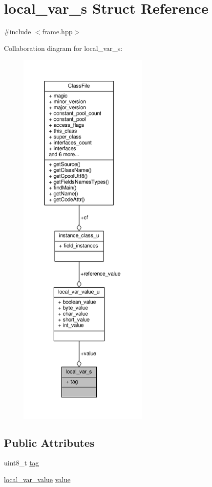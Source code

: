 \hypertarget{structlocal__var__s}{\section{local\+\_\+var\+\_\+s Struct Reference}
\label{structlocal__var__s}
}


{\ttfamily \#include $<$frame.\+hpp$>$}



Collaboration diagram for local\+\_\+var\+\_\+s\+:\nopagebreak
\begin{figure}[H]
\begin{center}
\leavevmode
\includegraphics[height=550pt]{structlocal__var__s__coll__graph}
\end{center}
\end{figure}
\subsection*{Public Attributes}
\begin{DoxyCompactItemize}
\item 
uint8\+\_\+t \hyperlink{structlocal__var__s_ab6da81466316f0fcec86450b154b2278}{tag}
\item 
\hyperlink{frame_8hpp_a4dcc6b91c94454a3d19452e6c1353533}{local\+\_\+var\+\_\+value} \hyperlink{structlocal__var__s_a5f2837a0cc5caf9a0b74f2f8745a0164}{value}
\end{DoxyCompactItemize}


